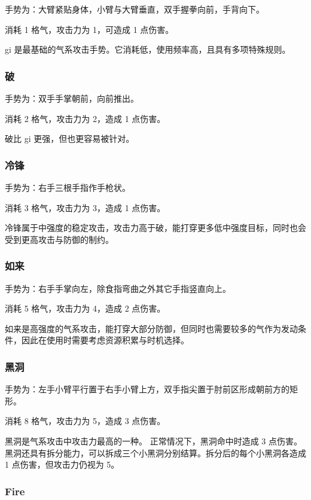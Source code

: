 \documentclass[12pt]{ctexart}
\begin{document}
手势为：大臂紧贴身体，小臂与大臂垂直，双手握拳向前，手背向下。

消耗 1 格气，攻击力为 1，可造成 1 点伤害。

gi 是最基础的气系攻击手势。它消耗低，使用频率高，且具有多项特殊规则。

\subsubsection{破}

手势为：双手手掌朝前，向前推出。

消耗 2 格气，攻击力为 2，造成 1 点伤害。

破比 gi 更强，但也更容易被针对。

\subsubsection{冷锋}

手势为：右手三根手指作手枪状。

消耗 3 格气，攻击力为 3，造成 1 点伤害。

冷锋属于中强度的稳定攻击，攻击力高于破，能打穿更多低中强度目标，同时也会受到更高攻击与防御的制约。

\subsubsection{如来}

手势为：右手手掌向左，除食指弯曲之外其它手指竖直向上。

消耗 5 格气，攻击力为 4，造成 2 点伤害。

如来是高强度的气系攻击，能打穿大部分防御，但同时也需要较多的气作为发动条件，因此在使用时需要考虑资源积累与时机选择。

\subsubsection{黑洞}

手势为：左手小臂平行置于右手小臂上方，双手指尖置于肘前区形成朝前方的矩形。

消耗 8 格气，攻击力为 5，造成 3 点伤害。

黑洞是气系攻击中攻击力最高的一种。
正常情况下，黑洞命中时造成 3 点伤害。
黑洞还具有拆分能力，可以拆成三个小黑洞分别结算。拆分后的每个小黑洞各造成 1 点伤害，但攻击力仍视为 5。

\subsubsection{Fire}
\end{document}

